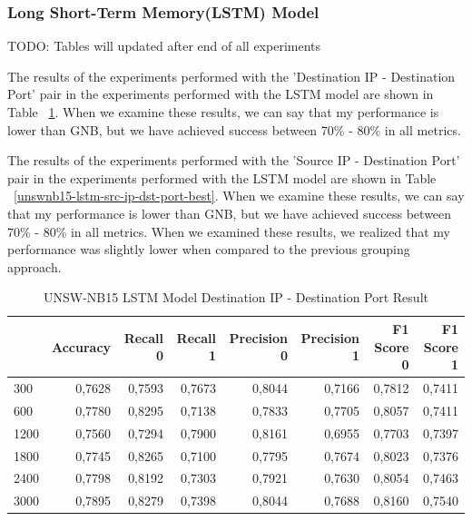 \documentclass{article}
\begin{document}
\subsubsection{Long Short-Term Memory(LSTM) Model}

TODO: Tables will updated after end of all experiments

The results of the experiments performed with the 'Destination IP - Destination Port' pair in the experiments performed with the LSTM model are shown in Table ~\ref{unswnb15-lstm-dst-ip-dst-port-best}. When we examine these results, we can say that my performance is lower than GNB, but we have achieved success between 70\% - 80\% in all metrics.

The results of the experiments performed with the 'Source IP - Destination Port' pair in the experiments performed with the LSTM model are shown in Table ~\ref{unswnb15-lstm-src-ip-dst-port-best}. When we examine these results, we can say that my performance is lower than GNB, but we have achieved success between 70\% - 80\% in all metrics. When we examined these results, we realized that my performance was slightly lower when compared to the previous grouping approach.


\begin{table}
  \centering
  \caption{UNSW-NB15 LSTM Model Destination IP - Destination Port Result}
  \label{unswnb15-lstm-dst-ip-dst-port-best}
  \begin{tabular}{lrrrrrrr}
    \toprule
	{Pred Win & Accuracy & Recall 0 & Recall 1 & Precision 0 & Precision 1 & F1 Score 0 & F1 Score 1} \\
	\midrule
        300 & 0,7628 & 0,7593 & 0,7673 & 0,8044 & 0,7166 & 0,7812 & 0,7411 \\ \hline
        600 & 0,7780 & 0,8295 & 0,7138 & 0,7833 & 0,7705 & 0,8057 & 0,7411 \\ \hline
        1200 & 0,7560 & 0,7294 & 0,7900 & 0,8161 & 0,6955 & 0,7703 & 0,7397 \\ \hline
        1800 & 0,7745 & 0,8265 & 0,7100 & 0,7795 & 0,7674 & 0,8023 & 0,7376 \\ \hline
        2400 & 0,7798 & 0,8192 & 0,7303 & 0,7921 & 0,7630 & 0,8054 & 0,7463 \\ \hline
        3000 & 0,7895 & 0,8279 & 0,7398 & 0,8044 & 0,7688 & 0,8160 & 0,7540 \\
	\bottomrule
  \end{tabular}
\end{table}
\end{document}
